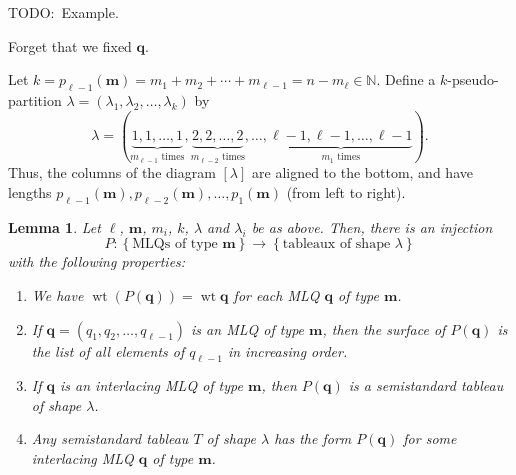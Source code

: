 \documentclass[reqno]{amsart}
\newcommand{\0}{\phantom{c}}
\theoremstyle{plain}
\newtheorem{lemma}[thm]{Lemma}
\theoremstyle{definition}
\numberwithin{equation}{section}
\begin{document}
TODO:\ Example.

Forget that we fixed $\mathbf{q}$.

Let $k=p_{\ell-1}\left(  \mathbf{m}\right)  =m_{1}+m_{2}+\cdots+m_{\ell
-1}=n-m_{\ell}\in\mathbb{N}$. Define a $k$-pseudo-partition $\lambda=\left(
\lambda_{1},\lambda_{2},\ldots,\lambda_{k}\right)  $ by%
\begin{equation}
\lambda=\left(  \underbrace{1,1,\ldots,1}_{m_{\ell-1}\text{ times}%
},\underbrace{2,2,\ldots,2}_{m_{\ell-2}\text{ times}},\ldots,\underbrace{\ell
-1,\ell-1,\ldots,\ell-1}_{m_{1}\text{ times}}\right)  .
\label{eq.determinant_form.interlacing.lam}%
\end{equation}
Thus, the columns of the diagram $\left[  \lambda\right]  $ are aligned to the
bottom, and have lengths $p_{\ell-1}\left(  \mathbf{m}\right)  ,p_{\ell
-2}\left(  \mathbf{m}\right)  ,\ldots,p_{1}\left(  \mathbf{m}\right)  $ (from
left to right).

\begin{lemma}
\label{lem:determinant_form.bij1}Let $\ell$, $\mathbf{m}$, $m_{i}$, $k$,
$\lambda$ and $\lambda_{i}$ be as above. Then, there is an injection%
\[
P:\left\{  \text{MLQs of type }\mathbf{m}\right\}  \rightarrow\left\{
\text{tableaux of shape }\lambda\right\}
\]
with the following properties:

\begin{enumerate}
\item[(a)] We have $\operatorname*{wt}\left(  P\left(  \mathbf{q}\right)
\right)  =\operatorname*{wt}\mathbf{q}$ for each MLQ $\mathbf{q}$ of type
$\mathbf{m}$.

\item[(b)] If $\mathbf{q}=\left(  q_{1},q_{2},\ldots,q_{\ell-1}\right)  $ is
an MLQ of type $\mathbf{m}$, then the surface of $P\left(  \mathbf{q}\right)
$ is the list of all elements of $q_{\ell-1}$ in increasing order.

\item[(c)] If $\mathbf{q}$ is an interlacing MLQ of type $\mathbf{m}$, then
$P\left(  \mathbf{q}\right)  $ is a semistandard tableau of shape $\lambda$.

\item[(d)] Any semistandard tableau $T$ of shape $\lambda$ has the form
$P\left(  \mathbf{q}\right)  $ for some interlacing MLQ $\mathbf{q}$ of type
$\mathbf{m}$.
\end{enumerate}
\end{lemma}
\end{document}
